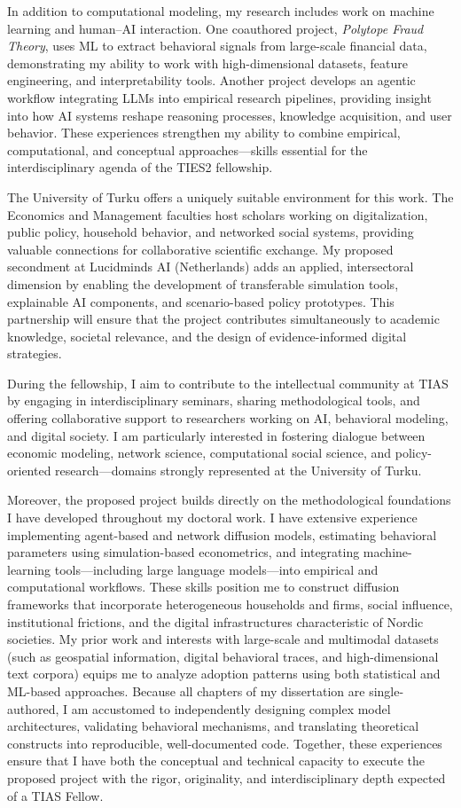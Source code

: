 \documentclass[11pt]{article}
\begin{document}
In addition to computational modeling, my research includes work on machine learning and human–AI interaction.  
One coauthored project, \emph{Polytope Fraud Theory}, uses ML to extract behavioral signals from large-scale financial data, demonstrating my ability to work with high-dimensional datasets, feature engineering, and interpretability tools.  
Another project develops an agentic workflow integrating LLMs into empirical research pipelines, providing insight into how AI systems reshape reasoning processes, knowledge acquisition, and user behavior.  
These experiences strengthen my ability to combine empirical, computational, and conceptual approaches—skills essential for the interdisciplinary agenda of the TIES2 fellowship.

The University of Turku offers a uniquely suitable environment for this work.  
The Economics and Management faculties host scholars working on digitalization, public policy, household behavior, and networked social systems, providing valuable connections for collaborative scientific exchange.  
My proposed secondment at Lucidminds AI (Netherlands) adds an applied, intersectoral dimension by enabling the development of transferable simulation tools, explainable AI components, and scenario-based policy prototypes.  
This partnership will ensure that the project contributes simultaneously to academic knowledge, societal relevance, and the design of evidence-informed digital strategies.

During the fellowship, I aim to contribute to the intellectual community at TIAS by engaging in interdisciplinary seminars, sharing methodological tools, and offering collaborative support to researchers working on AI, behavioral modeling, and digital society.  
I am particularly interested in fostering dialogue between economic modeling, network science, computational social science, and policy-oriented research—domains strongly represented at the University of Turku.

Moreover, the proposed project builds directly on the methodological foundations I have developed throughout my doctoral work. 
I have extensive experience implementing agent-based and network diffusion models, estimating behavioral parameters using simulation-based econometrics, and integrating machine-learning tools—including large language models—into empirical and computational workflows. 
These skills position me to construct diffusion frameworks that incorporate heterogeneous households and firms, social influence, institutional frictions, and the digital infrastructures characteristic of Nordic societies. 
My prior work and interests with large-scale and multimodal datasets (such as geospatial information, digital behavioral traces, and high-dimensional text corpora) equips me to analyze adoption patterns using both statistical and ML-based approaches. 
Because all chapters of my dissertation are single-authored, I am accustomed to independently designing complex model architectures, validating behavioral mechanisms, and translating theoretical constructs into reproducible, well-documented code. 
Together, these experiences ensure that I have both the conceptual and technical capacity to execute the proposed project with the rigor, originality, and interdisciplinary depth expected of a TIAS Fellow.
\end{document}
